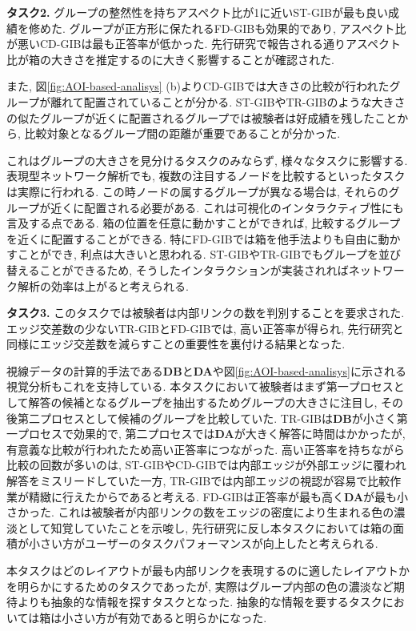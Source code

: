 \documentclass{kuee}
\begin{document}
{\bf タスク2.} グループの整然性を持ちアスペクト比が1に近いST-GIBが最も良い成績を修めた.
グループが正方形に保たれるFD-GIBも効果的であり, アスペクト比が悪いCD-GIBは最も正答率が低かった.
先行研究\cite{shneiderman1992tree}で報告される通りアスペクト比が箱の大きさを推定するのに大きく影響することが確認された.

また, 図\ref{fig:AOI-based-analisys} (b)よりCD-GIBでは大きさの比較が行われたグループが離れて配置されていることが分かる.
ST-GIBやTR-GIBのような大きさの似たグループが近くに配置されるグループでは被験者は好成績を残したことから, 比較対象となるグループ間の距離が重要であることが分かった.

これはグループの大きさを見分けるタスクのみならず, 様々なタスクに影響する.
表現型ネットワーク解析でも, 複数の注目するノードを比較するといったタスクは実際に行われる.
この時ノードの属するグループが異なる場合は, それらのグループが近くに配置される必要がある.
これは可視化のインタラクティブ性にも言及する点である.
箱の位置を任意に動かすことができれば, 比較するグループを近くに配置することができる.
特にFD-GIBでは箱を他手法よりも自由に動かすことができ, 利点は大きいと思われる.
ST-GIBやTR-GIBでもグループを並び替えることができるため, そうしたインタラクションが実装されればネットワーク解析の効率は上がると考えられる.

{\bf タスク3.} このタスクでは被験者は内部リンクの数を判別することを要求された.
エッジ交差数の少ないTR-GIBとFD-GIBでは, 高い正答率が得られ, 先行研究と同様にエッジ交差数を減らすことの重要性を裏付ける結果となった.

視線データの計算的手法である{\bf DB}と{\bf DA}や図\ref{fig:AOI-based-analisys}に示される視覚分析もこれを支持している.
本タスクにおいて被験者はまず第一プロセスとして解答の候補となるグループを抽出するためグループの大きさに注目し, その後第二プロセスとして候補のグループを比較していた.
TR-GIBは{\bf DB}が小さく第一プロセスで効果的で, 第二プロセスでは{\bf DA}が大きく解答に時間はかかったが, 有意義な比較が行われたため高い正答率につながった.
高い正答率を持ちながら比較の回数が多いのは, ST-GIBやCD-GIBでは内部エッジが外部エッジに覆われ解答をミスリードしていた一方, TR-GIBでは内部エッジの視認が容易で比較作業が精緻に行えたからであると考える.
FD-GIBは正答率が最も高く{\bf DA}が最も小さかった.
これは被験者が内部リンクの数をエッジの密度により生まれる色の濃淡として知覚していたことを示唆し, 先行研究に反し本タスクにおいては箱の面積が小さい方がユーザーのタスクパフォーマンスが向上したと考えられる.

本タスクはどのレイアウトが最も内部リンクを表現するのに適したレイアウトかを明らかにするためのタスクであったが, 実際はグループ内部の色の濃淡など期待よりも抽象的な情報を探すタスクとなった.
抽象的な情報を要するタスクにおいては箱は小さい方が有効であると明らかになった.
\end{document}
